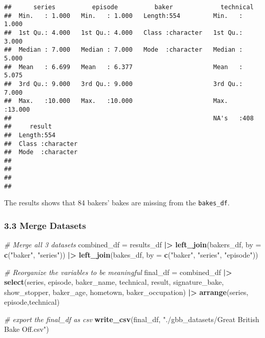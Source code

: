 \documentclass[
]{article}
\newenvironment{Shaded}{\begin{snugshade}}{\end{snugshade}}
\newcommand{\AttributeTok}[1]{\textcolor[rgb]{0.13,0.29,0.53}{#1}}
\newcommand{\CommentTok}[1]{\textcolor[rgb]{0.56,0.35,0.01}{\textit{#1}}}
\newcommand{\FunctionTok}[1]{\textcolor[rgb]{0.13,0.29,0.53}{\textbf{#1}}}
\newcommand{\NormalTok}[1]{#1}
\newcommand{\OtherTok}[1]{\textcolor[rgb]{0.56,0.35,0.01}{#1}}
\newcommand{\SpecialCharTok}[1]{\textcolor[rgb]{0.81,0.36,0.00}{\textbf{#1}}}
\newcommand{\StringTok}[1]{\textcolor[rgb]{0.31,0.60,0.02}{#1}}
\begin{document}
\begin{verbatim}
##      series          episode          baker             technical     
##  Min.   : 1.000   Min.   : 1.000   Length:554         Min.   : 1.000  
##  1st Qu.: 4.000   1st Qu.: 4.000   Class :character   1st Qu.: 3.000  
##  Median : 7.000   Median : 7.000   Mode  :character   Median : 5.000  
##  Mean   : 6.699   Mean   : 6.377                      Mean   : 5.075  
##  3rd Qu.: 9.000   3rd Qu.: 9.000                      3rd Qu.: 7.000  
##  Max.   :10.000   Max.   :10.000                      Max.   :13.000  
##                                                       NA's   :408     
##     result         
##  Length:554        
##  Class :character  
##  Mode  :character  
##                    
##                    
##                    
## 
\end{verbatim}

The results shows that 84 bakers' bakes are missing from the
\texttt{bakes\_df}.

\subsubsection{3.3 Merge Datasets}\label{merge-datasets}

\begin{Shaded}
\begin{Highlighting}[]
\CommentTok{\# Merge all 3 datasets}
\NormalTok{combined\_df }\OtherTok{=} 
\NormalTok{  results\_df }\SpecialCharTok{|\textgreater{}}
  \FunctionTok{left\_join}\NormalTok{(bakers\_df, }\AttributeTok{by =} \FunctionTok{c}\NormalTok{(}\StringTok{"baker"}\NormalTok{, }\StringTok{"series"}\NormalTok{)) }\SpecialCharTok{|\textgreater{}}
  \FunctionTok{left\_join}\NormalTok{(bakes\_df, }\AttributeTok{by =} \FunctionTok{c}\NormalTok{(}\StringTok{"baker"}\NormalTok{, }\StringTok{"series"}\NormalTok{, }\StringTok{"episode"}\NormalTok{))}

\CommentTok{\# Reorganize the variables to be meaningful}
\NormalTok{final\_df }\OtherTok{=}
\NormalTok{  combined\_df }\SpecialCharTok{|\textgreater{}}
  \FunctionTok{select}\NormalTok{(series, episode, baker\_name, technical, result, signature\_bake, show\_stopper, }
\NormalTok{         baker\_age, hometown, baker\_occupation) }\SpecialCharTok{|\textgreater{}}
  \FunctionTok{arrange}\NormalTok{(series, episode,technical)}

\CommentTok{\# export the final\_df as csv}
\FunctionTok{write\_csv}\NormalTok{(final\_df, }\StringTok{"./gbb\_datasets/Great British Bake Off.csv"}\NormalTok{)}
\end{Highlighting}
\end{Shaded}
\end{document}
